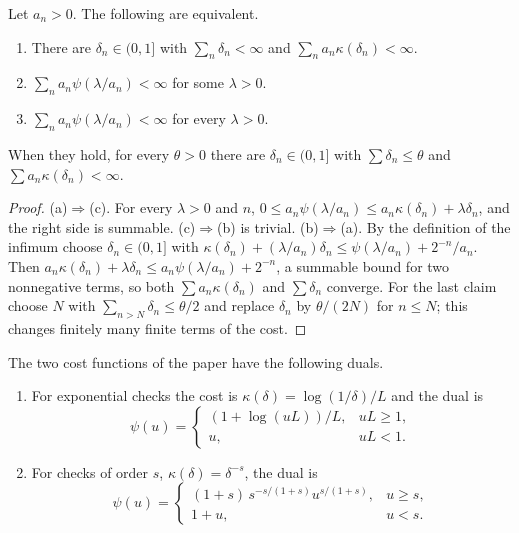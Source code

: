\begin{theorem}\label{thm:dual}
Let $a_{n}>0$. The following are equivalent.
\begin{enumerate}[label=\textup{(\alph*)},leftmargin=2.2em,itemsep=1pt]
\item There are $\delta_{n}\in(0,1]$ with $\sum_{n}\delta_{n}<\infty$ and $\sum_{n}a_{n}\kappa(\delta_{n})<\infty$.
\item $\sum_{n}a_{n}\psi(\lambda/a_{n})<\infty$ for some $\lambda>0$.
\item $\sum_{n}a_{n}\psi(\lambda/a_{n})<\infty$ for every $\lambda>0$.
\end{enumerate}
When they hold, for every $\theta>0$ there are $\delta_{n}\in(0,1]$ with $\sum\delta_{n}\le\theta$ and $\sum a_{n}\kappa(\delta_{n})<\infty$.
\end{theorem}

\begin{proof}
(a)$\Rightarrow$(c). For every $\lambda>0$ and $n$, $0\le a_{n}\psi(\lambda/a_{n})\le a_{n}\kappa(\delta_{n})+\lambda\delta_{n}$, and the right side is summable.
(c)$\Rightarrow$(b) is trivial.
(b)$\Rightarrow$(a). By the definition of the infimum choose $\delta_{n}\in(0,1]$ with $\kappa(\delta_{n})+(\lambda/a_{n})\delta_{n}\le\psi(\lambda/a_{n})+2^{-n}/a_{n}$. Then $a_{n}\kappa(\delta_{n})+\lambda\delta_{n}\le a_{n}\psi(\lambda/a_{n})+2^{-n}$, a summable bound for two nonnegative terms, so both $\sum a_{n}\kappa(\delta_{n})$ and $\sum\delta_{n}$ converge.
For the last claim choose $N$ with $\sum_{n>N}\delta_{n}\le\theta/2$ and replace $\delta_{n}$ by $\theta/(2N)$ for $n\le N$; this changes finitely many finite terms of the cost.
\end{proof}

\begin{proposition}\label{prop:dualcosts}
The two cost functions of the paper have the following duals.
\begin{enumerate}[label=\textup{(\roman*)},leftmargin=2.2em,itemsep=1pt]
\item For exponential checks the cost is $\kappa(\delta)=\log(1/\delta)/L$ and the dual is
\[
\psi(u)=\begin{cases}(1+\log(uL))/L,&uL\ge1,\\ u,&uL<1.\end{cases}
\]
\item For checks of order $s$, $\kappa(\delta)=\delta^{-s}$, the dual is
\[
\psi(u)=\begin{cases}(1+s)\,s^{-s/(1+s)}u^{s/(1+s)},&u\ge s,\\ 1+u,&u<s.\end{cases}
\]
\end{enumerate}
\end{proposition}

